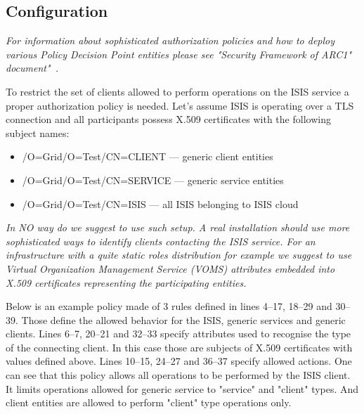 \documentclass{book}
\begin{document}

\subsection{Configuration}
\label{sub:isis_authorization_configuration}

\textit{For information about sophisticated authorization policies and how to deploy various Policy Decision Point entities please see "Security Framework of ARC1" document"~\cite{arcsec}.}

To restrict the set of clients allowed to perform operations on the ISIS service a proper authorization policy is needed. Let's assume ISIS is operating over a TLS connection and all participants possess X.509 certificates with the following subject names:
\begin{itemize}
\item /O=Grid/O=Test/CN=CLIENT --- generic client entities
\item /O=Grid/O=Test/CN=SERVICE --- generic service entities
\item /O=Grid/O=Test/CN=ISIS --- all ISIS belonging to ISIS cloud
\end{itemize}

\textit{In NO way do we suggest to use such setup. A real installation should use more sophisticated ways to 
identify clients contacting the ISIS service. For an infrastructure with a quite static roles distribution for 
example we suggest to use Virtual Organization Management Service (VOMS) attributes embedded into X.509 
certificates representing the participating entities.}

Below is an example policy made of 3 rules defined in lines 4--17, 18--29 and 30--39. Those define the allowed 
behavior for the ISIS, generic services and generic clients. Lines 6--7, 20--21 and 32--33 specify attributes 
used to recognise the type of the connecting client. In this case those are subjects of X.509 certificates with 
values defined above. Lines 10--15, 24--27 and 36--37 specify allowed actions. One can see that this policy 
allows all operations to be performed by the ISIS client. It limits operations allowed for generic service 
to "service" and "client" types. And client entities are allowed to perform "client" type operations only.
\end{document}
